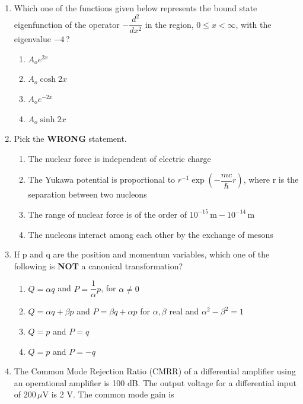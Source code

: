 \documentclass[14pt, a4paper]{extarticle}
\begin{document}
\begin{enumerate}[label=\textbf{Q. \arabic*}]
\item Which one of the functions given below represents the bound state eigenfunction of the operator $-\dfrac{d^2}{dx^2}$ in the region, $0 \le x < \infty$, with the eigenvalue $-4$\,?
    \begin{multicols}{2}
    \begin{enumerate}[label=(\Alph*)]
        \item $A_o e^{2x}$
        \item $A_o \cosh 2x$
        \item $A_o e^{-2x}$
        \item $A_o \sinh 2x$
    \end{enumerate}
    \end{multicols}

\item Pick the \textbf{WRONG} statement.
    \begin{enumerate}[label=(\Alph*)]
        \item The nuclear force is independent of electric charge
        \item The Yukawa potential is proportional to $r^{-1} \exp\left(-\dfrac{mc}{\hbar} r\right)$, where r is the separation between two nucleons
        \item The range of nuclear force is of the order of $10^{-15}\,\mathrm{m} - 10^{-14}\,\mathrm{m}$
        \item The nucleons interact among each other by the exchange of mesons
    \end{enumerate}

\item If p and q are the position and momentum variables, which one of the following is \textbf{NOT} a canonical transformation?
    \begin{enumerate}[label=(\Alph*)]
        \item $Q = \alpha q$ and $P = \dfrac{1}{\alpha}p$, for $\alpha \neq 0$
        \item $Q = \alpha q + \beta p$ and $P = \beta q + \alpha p$ for $\alpha, \beta$ real and $\alpha^2 - \beta^2 = 1$
        \item $Q = p$ and $P = q$
        \item $Q = p$ and $P = -q$
    \end{enumerate}

\item The Common Mode Rejection Ratio (CMRR) of a differential amplifier using an operational amplifier is 100 dB.
The output voltage for a differential input of $200\,\mu\text{V}$ is 2 V. The common mode gain is
\begin{enumerate}[label=(\Alph*)]
\end{enumerate}


\end{enumerate}
\end{document}
